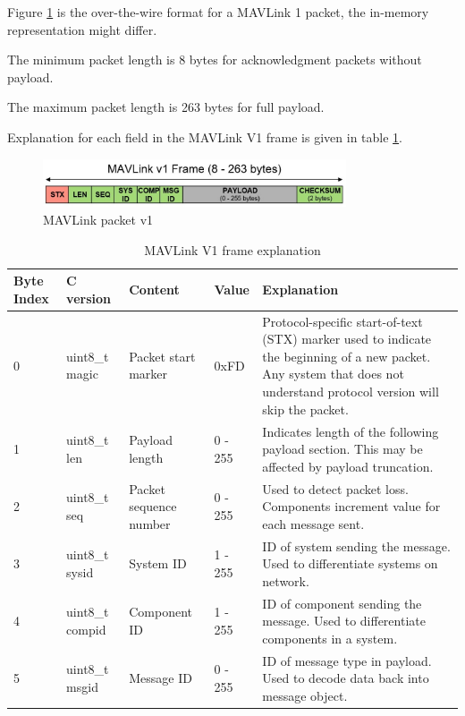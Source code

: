 \documentclass[\main/main.tex]{subfiles}
\begin{document}
Figure \ref{fig:packet_mavlink_v1} is the over-the-wire format for a MAVLink 1 packet, the in-memory representation might differ.

The minimum packet length is 8 bytes for acknowledgment packets without payload.

The maximum packet length is 263 bytes for full payload.

Explanation for each field in the MAVLink V1 frame is given in table \ref{tab:mavlink_v1_frame_explanation}.
\begin{figure}[H]
    \begin{center}
        \includegraphics[width=0.8\textwidth]{packet_mavlink_v1.jpg}
    \end{center}
    \caption{MAVLink packet v1}
    \label{fig:packet_mavlink_v1}
\end{figure}

\begin{table}[H]
    \begin{tabular}{ | p{1.3cm} | p{1.8cm} | p{2cm} | l | p{9cm} |}
    \hline
    Byte Index & C version & Content & Value & Explanation \\\hline
    0 & uint8\_t magic & Packet start marker	& 0xFD & Protocol-specific start-of-text (STX) marker used to indicate the beginning of a new packet. Any system that does not understand protocol version will skip the packet. \\\hline
    1 & uint8\_t len & Payload length & 0 - 255	& Indicates length of the following payload section. This may be affected by payload truncation. \\\hline
    2 & uint8\_t seq	& Packet sequence number & 0 - 255 & Used to detect packet loss. Components increment value for each message sent. \\\hline
    3 & uint8\_t sysid & System ID & 1 - 255 & ID of system  sending the message. Used to differentiate systems on network.\\\hline
    4 & uint8\_t compid	& Component ID & 1 - 255 & ID of component sending the message. Used to differentiate components in a system. \\\hline
    5 & uint8\_t msgid & Message ID & 0 - 255 & ID of message type in payload. Used to decode data back into message object.\\\hline
    \end{tabular}
    \caption{MAVLink V1 frame explanation}
    \label{tab:mavlink_v1_frame_explanation}
\end{table}
\end{document}
